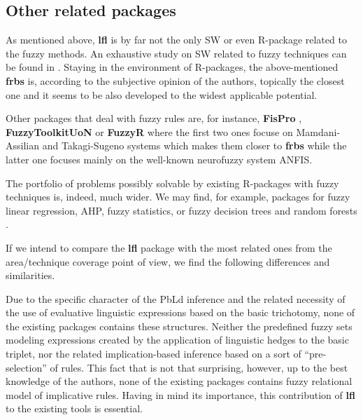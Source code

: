 \documentclass[review]{elsarticle}
\newcommand{\pkg}[1]{\textbf{#1}}
\begin{document}
\subsection{Other related packages}

As mentioned above, \pkg{lfl} is by far not the only SW or even R-package related to the fuzzy methods. An exhaustive study on SW related to fuzzy techniques can be found in \cite{AlcalAlonso:fuzzySW_IEEETFS16}. Staying in the environment of R-packages, the above-mentioned \pkg{frbs} \citep{frbsPkg,FRBS:jstatsoft14} is, according to the subjective opinion of the authors, topically the closest one and it seems to be also developed to the widest applicable potential. 

Other packages that deal with fuzzy rules are, for instance, \pkg{FisPro} \citep{fisproPkg}, \pkg{FuzzyToolkitUoN} \citep{FuzzyToolkitUoNPkg} or \pkg{FuzzyR} \citep{FuzzyRPkg} where the first two ones focuse on Mamdani-Assilian and Takagi-Sugeno systems which makes them closer to \pkg{frbs} while the latter one focuses mainly on the well-known neurofuzzy system ANFIS. 

The portfolio of problems possibly solvable by existing R-packages with fuzzy techniques is, indeed, much wider. We may find, for example, packages for fuzzy linear regression, AHP, fuzzy statistics, or fuzzy decision trees and random forests \citep{fuzzyforestPkg,fuzzyforestJSS}.

If we intend to compare the \pkg{lfl} package with the most related ones from the area/technique coverage point of view, we find the following differences and similarities.  

Due to the specific character of the PbLd inference and the related necessity of the use of evaluative linguistic expressions \citep{Novak:ELE_FSS} based on the basic trichotomy, none of the existing packages contains these structures. Neither the predefined fuzzy sets modeling expressions created by the application of linguistic hedges to the basic triplet, nor the related implication-based inference based on a sort of ``pre-selection'' of rules. This fact that is not that surprising, however, up to the best knowledge of the authors, none of the existing packages contains fuzzy relational model of implicative rules. Having in mind its importance, this contribution of {\bf lfl} to the existing tools is essential. 
\end{document}
